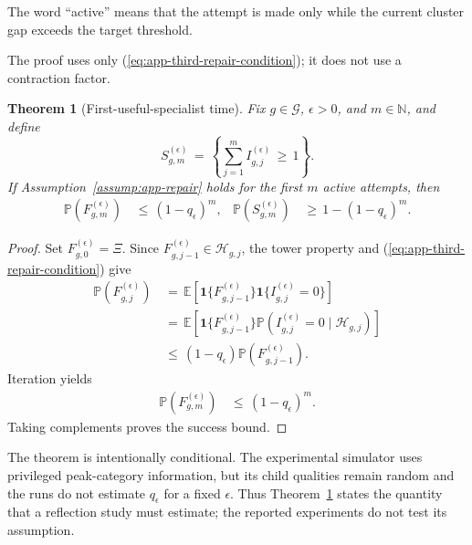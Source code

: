 \documentclass{article} %
\newtheorem{theorem}{Theorem}
\renewcommand{\eqref}[1]{\textup{(\ref{#1})}}
\begin{document}
The word ``active'' means that the attempt is made only while the current cluster gap exceeds the target threshold.

The proof uses only \eqref{eq:app-third-repair-condition}; it does not use a contraction factor.

\begin{theorem}[First-useful-specialist time]
\label{thm:generalization}
Fix \(g\in\mathcal G\), \(\epsilon>0\), and \(m\in\mathbb N\), and define
\begin{equation}
S_{g,m}^{(\epsilon)}
\,=\,
\left\{
\sum_{j=1}^{m}
I_{g,j}^{(\epsilon)}
\,\geq\,
1
\right\}.
\end{equation}
If Assumption~\ref{assump:app-repair} holds for the first \(m\) active
attempts, then
\begin{equation}
\begin{aligned}
\mathbb{P}\!\left(
F_{g,m}^{(\epsilon)}
\right)
&\,\leq\,(1-q_{\epsilon})^m, &
\mathbb{P}\!\left(S_{g,m}^{(\epsilon)}\right)
&\,\geq\,1-(1-q_{\epsilon})^m.
\end{aligned}
\end{equation}
\end{theorem}

\begin{proof}
Set \(F_{g,0}^{(\epsilon)}=\Xi\).  Since
\(F_{g,j-1}^{(\epsilon)}\in\mathcal H_{g,j}\), the tower property and
\eqref{eq:app-third-repair-condition} give
\begin{equation}
\begin{aligned}
\mathbb{P}\!\left(F_{g,j}^{(\epsilon)}\right)
&\,=\,
\mathbb{E}\!\left[
\mathbf{1}\{F_{g,j-1}^{(\epsilon)}\}
\mathbf{1}\{I_{g,j}^{(\epsilon)}=0\}
\right]
\\
&\,=\,
\mathbb{E}\!\left[
\mathbf{1}\{F_{g,j-1}^{(\epsilon)}\}
\mathbb{P}\!\left(
I_{g,j}^{(\epsilon)}=0
\mid
\mathcal{H}_{g,j}
\right)
\right] \\
&\,\le\,
(1-q_{\epsilon})
\mathbb{P}\!\left(F_{g,j-1}^{(\epsilon)}\right).
\end{aligned}
\end{equation}
Iteration yields
\begin{equation}
\begin{aligned}
\mathbb{P}\!\left(F_{g,m}^{(\epsilon)}\right)
&\,\leq\,(1-q_{\epsilon})^m.
\end{aligned}
\end{equation}
Taking complements proves the success bound.
\end{proof}

The theorem is intentionally conditional. The experimental simulator uses privileged
peak-category information, but its child qualities remain random and the runs
do not estimate \(q_\epsilon\) for a fixed \(\epsilon\). Thus
Theorem~\ref{thm:generalization} states the quantity that a reflection study
must estimate; the reported experiments do not test its assumption.
\end{document}
